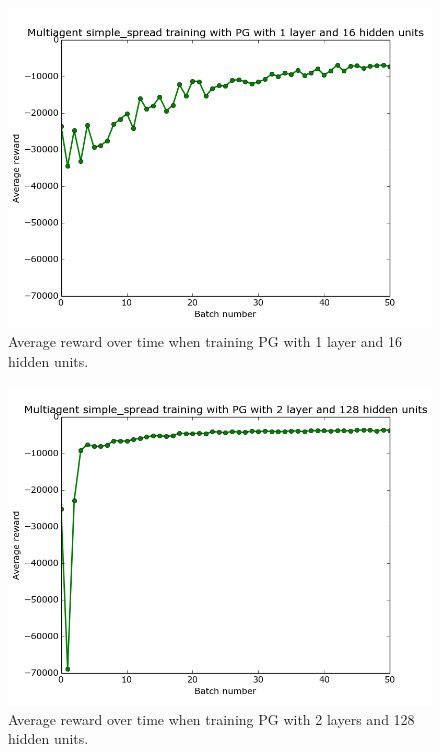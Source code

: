 \documentclass{article}
\begin{document}
\begin{figure}
\begin{center}
    \includegraphics[scale=0.25]{pg-1-16-gamma1}
    \caption{Average reward over time when training PG with 1 layer and 16 hidden units.}
\end{center}
\label{fig:pg-1-16}
\end{figure}

\begin{figure}
\begin{center}
    \includegraphics[scale=0.25]{pg-2-128-gamma1}
    \caption{Average reward over time when training PG with 2 layers and 128 hidden units.}
\end{center}
\label{fig:pg-2-128}
\end{figure}
\end{document}
